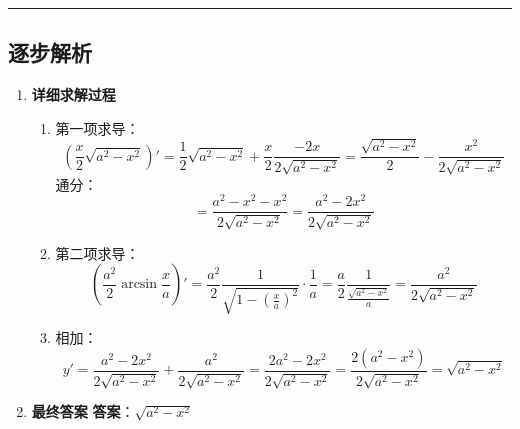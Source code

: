 \documentclass[UTF8]{ctexart}
\newenvironment{redenv}{\color{red}}{}
\newenvironment{detailedanalysis}{%
    \color{red}
    \begin{enumerate}[label=\textbf{第\arabic*步：}, leftmargin=*, align=left, itemsep=1.5ex]
}{%
    \end{enumerate}
}
\newcommand{\analysisrule}{\noindent\rule{\textwidth}{0.8pt}\vspace{-0.8em}}
\begin{document}
\begin{redenv}
\analysisrule
\subsection*{逐步解析}

\begin{detailedanalysis}
\item \textbf{详细求解过程}
\begin{enumerate}[label=(\arabic*)]
\item 第一项求导：
$$ (\frac{x}{2} \sqrt{a^2-x^2})' = \frac{1}{2} \sqrt{a^2-x^2} + \frac{x}{2} \frac{-2x}{2\sqrt{a^2-x^2}} = \frac{\sqrt{a^2-x^2}}{2} - \frac{x^2}{2\sqrt{a^2-x^2}} $$
通分：
$$ = \frac{a^2-x^2 - x^2}{2\sqrt{a^2-x^2}} = \frac{a^2-2x^2}{2\sqrt{a^2-x^2}} $$
\item 第二项求导：
$$ (\frac{a^2}{2} \arcsin \frac{x}{a})' = \frac{a^2}{2} \frac{1}{\sqrt{1-(\frac{x}{a})^2}} \cdot \frac{1}{a} = \frac{a}{2} \frac{1}{\frac{\sqrt{a^2-x^2}}{a}} = \frac{a^2}{2\sqrt{a^2-x^2}} $$
\item 相加：
$$ y' = \frac{a^2-2x^2}{2\sqrt{a^2-x^2}} + \frac{a^2}{2\sqrt{a^2-x^2}} = \frac{2a^2-2x^2}{2\sqrt{a^2-x^2}} = \frac{2(a^2-x^2)}{2\sqrt{a^2-x^2}} = \sqrt{a^2-x^2} $$
\end{enumerate}

\item \textbf{最终答案}
\textbf{答案}：$ \sqrt{a^2-x^2} $
\end{detailedanalysis}
\end{redenv}
\end{document}
